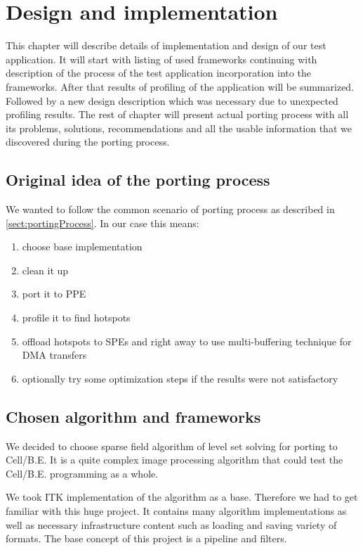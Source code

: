\chapter{Design and implementation}

This chapter will describe details of implementation and design of our test application.
It will start with listing of used frameworks continuing with description of the process of the test application incorporation into the frameworks.
After that results of profiling of the application will be summarized.
Followed by a new design description which was necessary due to unexpected profiling results.
The rest of chapter will present actual porting process with all its problems, solutions, recommendations and all the usable information that we discovered during the porting process.

\section{Original idea of the porting process}

We wanted to follow the common scenario of porting process as described in \ref{sect:portingProcess}.
In our case this means:
\begin{enumerate}
\item{choose base implementation}
\item{clean it up}
\item{port it to PPE}
\item{profile it to find hotspots}
\item{offload hotspots to SPEs and right away to use multi-buffering technique for DMA transfers}
\item{optionally try some optimization steps if the results were not satisfactory}
\end{enumerate}

\section{Chosen algorithm and frameworks}

\par
We decided to choose sparse field algorithm of level set solving for porting to \mbox{Cell/B.E.}
It is a quite complex image processing algorithm that could test the \mbox{Cell/B.E.} programming as a whole.

\par
We took ITK \cite{itk} implementation of the algorithm as a base.
Therefore we had to get familiar with this huge project.
It contains many algorithm implementations as well as necessary infrastructure content such as loading and saving variety of formats.
The base concept of this project is a pipeline and filters.

